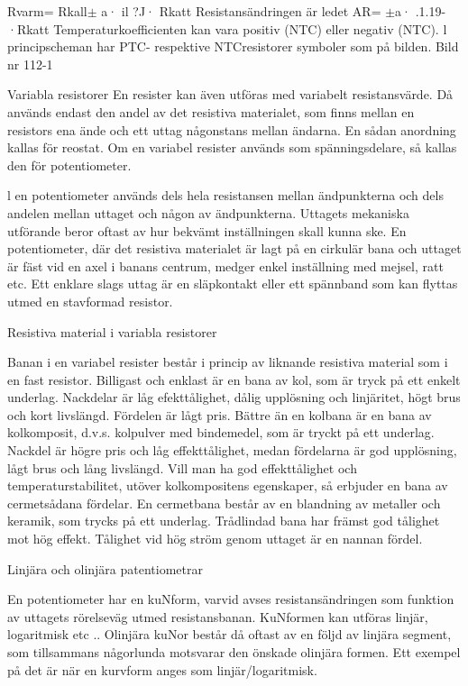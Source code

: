 Rvarm= Rkall$\pm$ a· il ?J· Rkatt
Resistansändringen är ledet
AR= $\pm$a· .1.19- ·Rkatt
Temperaturkoefficienten kan vara positiv (NTC) eller negativ (NTC).
l principscheman har PTC- respektive NTCresistorer symboler som på bilden.
Bild nr 112-1

Variabla resistorer
En resister kan även utföras med variabelt
resistansvärde. Då används endast den andel av det resistiva materialet, som finns
mellan en resistors ena ände och ett uttag
någonstans mellan ändarna. En sådan anordning kallas för reostat. Om en variabel
resister används som spänningsdelare, så
kallas den för potentiometer.

l en potentiometer används dels hela
resistansen mellan ändpunkterna och dels
andelen mellan uttaget och någon av
ändpunkterna.
Uttagets mekaniska utförande beror oftast av hur bekvämt inställningen skall kunna
ske. En potentiometer, där det resistiva
materialet är lagt på en cirkulär bana och
uttaget är fäst vid en axel i banans centrum,
medger enkel inställning med mejsel, ratt
etc. Ett enklare slags uttag är en släpkontakt
eller ett spännband som kan flyttas utmed en
stavformad resistor.

Resistiva material i variabla resistorer

Banan i en variabel resister består i princip
av liknande resistiva material som i en fast
resistor.
Billigast och enklast är en bana av kol,
som är tryck på ett enkelt underlag. Nackdelar är låg efekttålighet, dålig upplösning och
linjäritet, högt brus och kort livslängd. Fördelen är lågt pris.
Bättre än en kolbana är en bana av kolkomposit, d.v.s. kolpulver med bindemedel,
som är tryckt på ett underlag. Nackdel är
högre pris och låg effekttålighet, medan fördelarna är god upplösning, lågt brus och
lång livslängd.
Vill man ha god effekttålighet och temperaturstabilitet, utöver kolkompositens egenskaper, så erbjuder en bana av cermetsådana fördelar. En cermetbana består av en
blandning av metaller och keramik, som
trycks på ett underlag.
Trådlindad bana har främst god tålighet
mot hög effekt. Tålighet vid hög ström genom uttaget är en nannan fördel.

Linjära och olinjära patentiometrar

En potentiometer har en kuNform, varvid
avses resistansändringen som funktion av
uttagets rörelseväg utmed resistansbanan.
KuNformen kan utföras linjär, logaritmisk
etc .. Olinjära kuNor består då oftast av en
följd av linjära segment, som tillsammans
någorlunda motsvarar den önskade olinjära
formen. Ett exempel på det är när en kurvform
anges som linjär/logaritmisk.

